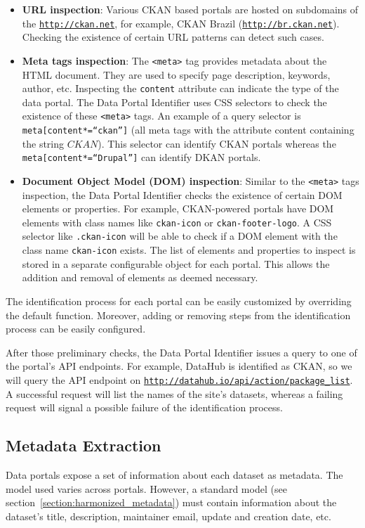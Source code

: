 \begin{itemize}
  \item \textbf{URL inspection}: Various CKAN based portals are hosted on subdomains of the \texttt{\url{http://ckan.net}}, for example, CKAN Brazil (\texttt{\url{http://br.ckan.net}}). Checking the existence of certain URL patterns can detect such cases.
  \item \textbf{Meta tags inspection}: The \texttt{<meta>} tag provides metadata about the HTML document. They are used to specify page description, keywords, author, etc. Inspecting the \texttt{content} attribute can indicate the type of the data portal. The Data Portal Identifier uses CSS selectors to check the existence of these \texttt{<meta>} tags. An example of a query selector is \texttt{meta[content*=``ckan'']} (all meta tags with the attribute content containing the string $CKAN$). This selector can identify CKAN portals whereas the \texttt{meta[content*=``Drupal'']} can identify DKAN portals.
  \item \textbf{Document Object Model (DOM) inspection}: Similar to the \texttt{<meta>} tags inspection, the Data Portal Identifier checks the existence of certain DOM elements or properties. For example, CKAN-powered portals have DOM elements with class names like \texttt{ckan-icon} or \texttt{ckan-footer-logo}. A CSS selector like \texttt{.ckan-icon} will be able to check if a DOM element with the class name \texttt{ckan-icon} exists.
  The list of elements and properties to inspect is stored in a separate configurable object for each portal. This allows the addition and removal of elements as deemed necessary.
\end{itemize}

The identification process for each portal can be easily customized by overriding the default function. Moreover, adding or removing steps from the identification process can be easily configured.

After those preliminary checks, the Data Portal Identifier issues a query to one of the portal's API endpoints. For example, DataHub is identified as CKAN, so we will query the API endpoint on \texttt{\url{http://datahub.io/api/action/package\_list}}. A successful request will list the names of the site's datasets, whereas a failing request will signal a possible failure of the identification process.

\subsection{Metadata Extraction}
Data portals expose a set of information about each dataset as metadata. The model used varies across portals. However, a standard model (see section~\ref{section:harmonized_metadata}) must contain information about the dataset's title, description, maintainer email, update and creation date, etc.

